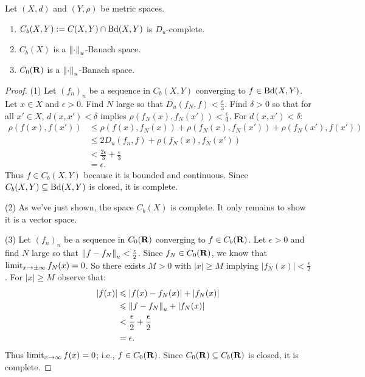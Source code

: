     \begin{corollary}
        Let $(X,d)$ and $(Y,\rho)$ be metric spaces.
        \begin{enumerate}[label = (\arabic*),itemsep=1pt,topsep=3pt]
            \item $C_b(X,Y) := C(X,Y) \cap \operatorname{Bd}(X,Y)$ is $D_u$-complete.
            \item $C_b(X)$ is a $\left\lVert \cdot \right\rVert_u$-Banach space.
            \item $C_0(\mathbf{R})$ is a $\left\lVert \cdot \right\rVert_u$-Banach space.
        \end{enumerate}
    \end{corollary}
        \begin{proof}
            (1) Let $(f_n)_n$ be a sequence in $C_b(X,Y)$ converging to $f \in \operatorname{Bd}(X,Y)$. Let $x\in X$ and $\epsilon > 0$. Find $N$ large so that $D_u(f_N,f) < \frac{\epsilon}{3}$. Find $\delta > 0$ so that for all $x' \in X$, $d(x,x') < \delta$ implies $\rho(f_N(x),f_N(x')) < \frac{\epsilon}{3}$. For $d(x,x') < \delta$:
                \begin{equation*}
                \begin{split}
                    \rho(f(x),f(x'))
                    & \leq \rho(f(x),f_N(x)) + \rho(f_N(x),f_N(x')) + \rho(f_N(x'),f(x')) \\
                    & \leq 2D_u(f_n,f) + \rho(f_N(x),f_N(x')) \\
                    & < \frac{2\epsilon}{3} + \frac{\epsilon}{3} \\
                    & = \epsilon.
                \end{split}
                \end{equation*}
            Thus $f \in C_b(X,Y)$ because it is bounded and continuous. Since $C_b(X,Y) \subseteq \operatorname{Bd}(X,Y)$ is closed, it is complete.

            (2) As we've just shown, the space $C_b(X)$ is complete. It only remains to show it is a vector space.

            (3) Let $(f_n)_n$ be a sequence in $C_0(\mathbf{R})$ converging to $f \in C_b(\mathbf{R})$. Let $\epsilon > 0$ and find $N$ large so that $\left\lVert f - f_N \right\rVert_u < \frac{\epsilon}{2}$. Since $f_N \in C_0(\mathbf{R})$, we know that $\operatorname*{limit}_{x \rightarrow \pm \infty}f_N(x) = 0$. So there exists $M > 0$ with $|x| \geq M$ implying $|f_N(x)| < \frac{\epsilon}{2}$. For $|x| \geq M$ observe that:
                \begin{equation*}
                \begin{split}
                    |f(x)|
                    & \leqslant |f(x) - f_N(x)| + |f_N(x)| \\
                    & \leqslant \left\lVert f - f_N \right\rVert_u + |f_N(x)| \\
                    & < \frac{\epsilon}{2} + \frac{\epsilon}{2} \\
                    & = \epsilon.
                \end{split}
                \end{equation*}
            Thus $\operatorname*{limit}_{x \rightarrow \infty}f(x) = 0$; i.e., $f \in C_0(\mathbf{R})$. Since $C_0(\mathbf{R}) \subseteq C_b(\mathbf{R})$ is closed, it is complete.
        \end{proof}

